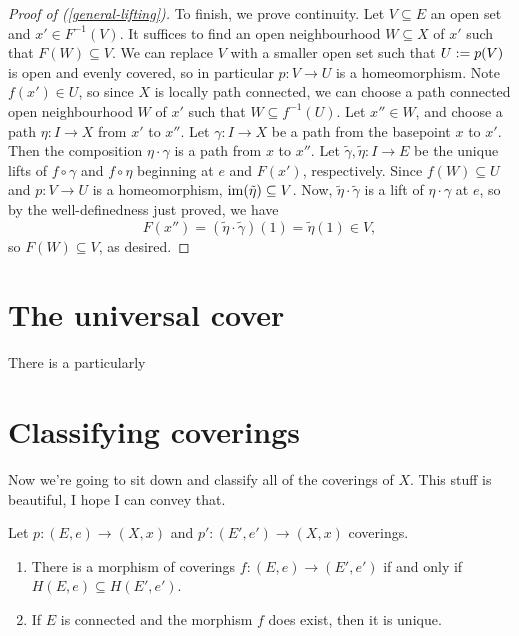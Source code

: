 \begin{proof}[Proof of (\ref{general-lifting})]
  To finish, we prove continuity. Let $V \subseteq E$ an open set and
  $x' \in F^{-1}(V)$. It suffices to find an open neighbourhood $W
  \subseteq X$ of $x'$ such that $F(W) \subseteq V$. We can replace
  $V$ with a smaller open set such that $U \mathrel{:=} p(V)$ is open and
  evenly covered, so in particular $p : V \to U$ is a
  homeomorphism. Note $f(x') \in U$, so since $X$ is locally path
  connected, we can choose a path connected open neighbourhood $W$ of
  $x'$ such that $W \subseteq f^{-1}(U)$. Let $x'' \in W$, and choose
  a path $\eta : I \to X$ from $x'$ to $x''$. Let $\gamma : I \to X$
  be a path from the basepoint $x$ to $x'$. Then the composition $\eta
  \cdot \gamma$ is a path from $x$ to $x''$. Let $\tilde\gamma,
  \tilde\eta : I \to E$ be the unique lifts of $f \circ \gamma$ and $f
  \circ \eta$ beginning at $e$ and $F(x')$, respectively. Since $f(W)
  \subseteq U$ and $p : V \to U$ is a homeomorphism, $\operatorname{im}(\tilde\eta)
  \subseteq V$. Now, $\tilde\eta \cdot \tilde\gamma$ is a lift of
  $\eta \cdot \gamma$ at $e$, so by the well-definedness just proved,
  we have
  \[
  F(x'') = (\tilde\eta \cdot \tilde\gamma)(1) = \tilde\eta(1) \in V,
  \]
  so $F(W) \subseteq V$, as desired.
\end{proof}


\section{The universal cover}

There is a particularly


\section{Classifying coverings}

Now we're going to sit down and classify all of the coverings of
$X$. This stuff is beautiful, I hope I can convey that.

\begin{lemma}
  Let $p : (E,e) \to (X,x)$ and $p' : (E',e') \to (X,x)$
  coverings.
  \begin{enumerate}
  \item There is a morphism of coverings $f : (E,e) \to (E',e')$
    if and only if $H(E,e) \subseteq H(E',e')$.
  \item If $E$ is connected and the morphism $f$ does exist, then it
    is unique.
  \end{enumerate}
\end{lemma}


